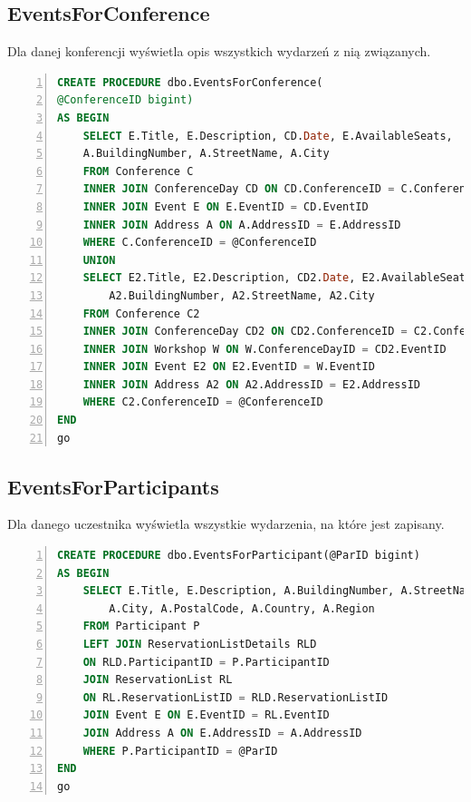 \documentclass[]{article}
\begin{document}
	\subsection{EventsForConference}
	Dla danej konferencji wyświetla opis wszystkich wydarzeń z nią związanych.
	\begin{lstlisting}[language=SQL,
						showspaces=false,
						basicstyle=\ttfamily,
						numbers=left,
						numberstyle=\tiny,
						backgroundcolor=\color{lightg},
						keywordstyle=\color{lightblue},
						commentstyle=\color{gray}]
CREATE PROCEDURE dbo.EventsForConference(
@ConferenceID bigint)
AS BEGIN
	SELECT E.Title, E.Description, CD.Date, E.AvailableSeats,
	A.BuildingNumber, A.StreetName, A.City
	FROM Conference C
	INNER JOIN ConferenceDay CD ON CD.ConferenceID = C.ConferenceID
	INNER JOIN Event E ON E.EventID = CD.EventID
	INNER JOIN Address A ON A.AddressID = E.AddressID
	WHERE C.ConferenceID = @ConferenceID
	UNION
	SELECT E2.Title, E2.Description, CD2.Date, E2.AvailableSeats,
		A2.BuildingNumber, A2.StreetName, A2.City
	FROM Conference C2
	INNER JOIN ConferenceDay CD2 ON CD2.ConferenceID = C2.ConferenceID
	INNER JOIN Workshop W ON W.ConferenceDayID = CD2.EventID
	INNER JOIN Event E2 ON E2.EventID = W.EventID
	INNER JOIN Address A2 ON A2.AddressID = E2.AddressID
	WHERE C2.ConferenceID = @ConferenceID
END
go
	\end{lstlisting}

	\subsection{EventsForParticipants}
	Dla danego uczestnika wyświetla wszystkie wydarzenia, na które jest zapisany.
	\begin{lstlisting}[language=SQL,
						showspaces=false,
						basicstyle=\ttfamily,
						numbers=left,
						numberstyle=\tiny,
						backgroundcolor=\color{lightg},
						keywordstyle=\color{lightblue},
						commentstyle=\color{gray}]
CREATE PROCEDURE dbo.EventsForParticipant(@ParID bigint)
AS BEGIN
	SELECT E.Title, E.Description, A.BuildingNumber, A.StreetName,
		A.City, A.PostalCode, A.Country, A.Region
	FROM Participant P
	LEFT JOIN ReservationListDetails RLD
	ON RLD.ParticipantID = P.ParticipantID
	JOIN ReservationList RL
	ON RL.ReservationListID = RLD.ReservationListID
	JOIN Event E ON E.EventID = RL.EventID
	JOIN Address A ON E.AddressID = A.AddressID
	WHERE P.ParticipantID = @ParID
END
go
	\end{lstlisting}
\end{document}
